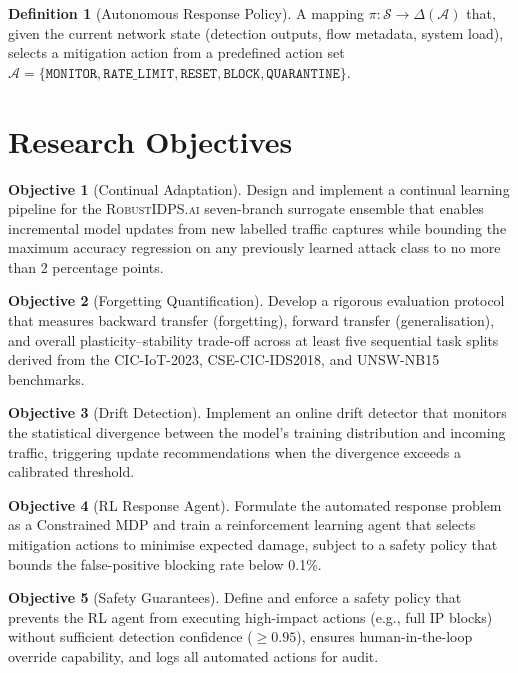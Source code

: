 \documentclass[12pt,a4paper]{article}
\newcommand{\RobustIDPS}{\textsc{RobustIDPS.ai}}
\theoremstyle{definition}
\newtheorem{definition}{Definition}[section]
\newtheorem{objective}{Objective}[section]
\begin{document}
\begin{definition}[Autonomous Response Policy]
A mapping $\pi: \mathcal{S} \to \Delta(\mathcal{A})$ that, given the current network state (detection outputs, flow metadata, system load), selects a mitigation action from a predefined action set $\mathcal{A} = \{\texttt{MONITOR}, \texttt{RATE\_LIMIT}, \texttt{RESET}, \texttt{BLOCK}, \texttt{QUARANTINE}\}$.
\end{definition}


\section{Research Objectives}
\label{sec:objectives}

\begin{objective}[Continual Adaptation]
Design and implement a continual learning pipeline for the \RobustIDPS{} seven-branch surrogate ensemble that enables incremental model updates from new labelled traffic captures while bounding the maximum accuracy regression on any previously learned attack class to no more than 2 percentage points.
\end{objective}

\begin{objective}[Forgetting Quantification]
Develop a rigorous evaluation protocol that measures backward transfer (forgetting), forward transfer (generalisation), and overall plasticity--stability trade-off across at least five sequential task splits derived from the CIC-IoT-2023, CSE-CIC-IDS2018, and UNSW-NB15 benchmarks.
\end{objective}

\begin{objective}[Drift Detection]
Implement an online drift detector that monitors the statistical divergence between the model's training distribution and incoming traffic, triggering update recommendations when the divergence exceeds a calibrated threshold.
\end{objective}

\begin{objective}[RL Response Agent]
Formulate the automated response problem as a Constrained MDP and train a reinforcement learning agent that selects mitigation actions to minimise expected damage, subject to a safety policy that bounds the false-positive blocking rate below 0.1\%.
\end{objective}

\begin{objective}[Safety Guarantees]
Define and enforce a safety policy that prevents the RL agent from executing high-impact actions (e.g., full IP blocks) without sufficient detection confidence ($\geq 0.95$), ensures human-in-the-loop override capability, and logs all automated actions for audit.
\end{objective}
\end{document}
